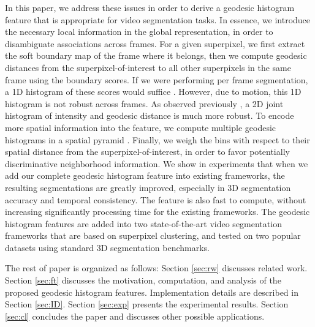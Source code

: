 \documentclass[runningheads]{llncs}
\begin{document}
In this paper, we address these issues in order to derive a geodesic histogram feature that is appropriate for video segmentation tasks. In essence, we introduce the necessary local information in the global representation, in order to disambiguate associations across frames. For a given superpixel, we first extract the soft boundary map of the frame where it belongs, then we compute geodesic distances from the superpixel-of-interest to all other superpixels in the same frame using the boundary scores. If we were performing per frame segmentation, a 1D histogram of these scores would suffice \cite{Bai:4408931}. However, due to motion, this 1D histogram is not robust across frames. As observed  previously \cite{geohis}, a 2D joint histogram of intensity and geodesic distance is much more robust. To encode more spatial information into the feature, we compute multiple  geodesic histograms in a spatial pyramid \cite{1641019}. Finally, we weigh the bins with respect to their spatial distance from the superpixel-of-interest, in order to favor potentially discriminative neighborhood information. We show in experiments that when we add our complete geodesic histogram feature into existing frameworks, the resulting segmentations are greatly improved, especially in 3D segmentation accuracy and temporal consistency. The feature is also fast to compute, without increasing significantly processing time for the existing frameworks. The geodesic histogram features are added into two state-of-the-art video segmentation frameworks that are based on superpixel clustering, and tested on two popular datasets using standard 3D segmentation benchmarks.


The rest of paper is organized as follows: Section \ref{sec:rw} discusses related work. Section \ref{sec:ft} discusses the motivation, computation, and analysis of the proposed geodesic histogram features. Implementation details are described in Section \ref{sec:ID}. Section \ref{sec:exp} presents the experimental results. Section \ref{sec:cl}  concludes the paper and discusses other possible applications.
\end{document}
